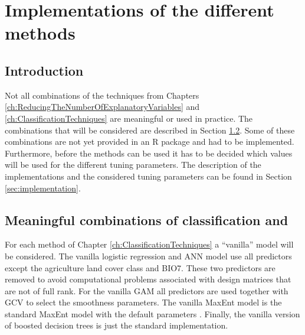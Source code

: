 \chapter{Implementations of the different methods}
\label{ch:Implementations}
\section{Introduction}
Not all combinations of the techniques from Chapters \ref{ch:ReducingTheNumberOfExplanatoryVariables} and \ref{ch:ClassificationTechniques} are meaningful or used in practice. The combinations that will be considered are described in Section \ref{sec:combinations}. Some of these combinations are not yet provided in an R package and had to be implemented. Furthermore, before the methods can be used it has to be decided which values will be used for the different tuning parameters. The description of the implementations and the considered tuning parameters can be found in Section \ref{sec:implementation}.

\section{Meaningful combinations of classification and }
\label{sec:combinations}
 

For each method of Chapter \ref{ch:ClassificationTechniques} a ``vanilla'' model will be considered. The vanilla logistic regression and ANN model use all predictors except the agriculture land cover class and BIO7. These two predictors are removed to avoid computational problems associated with design matrices that are not of full rank. For the vanilla GAM all predictors are used together with GCV to select the smoothness parameters. The vanilla MaxEnt model is the standard MaxEnt model with the default parameters \parencite{phillips_modeling_2008}. Finally, the vanilla version of boosted decision trees is just the standard implementation. \\

